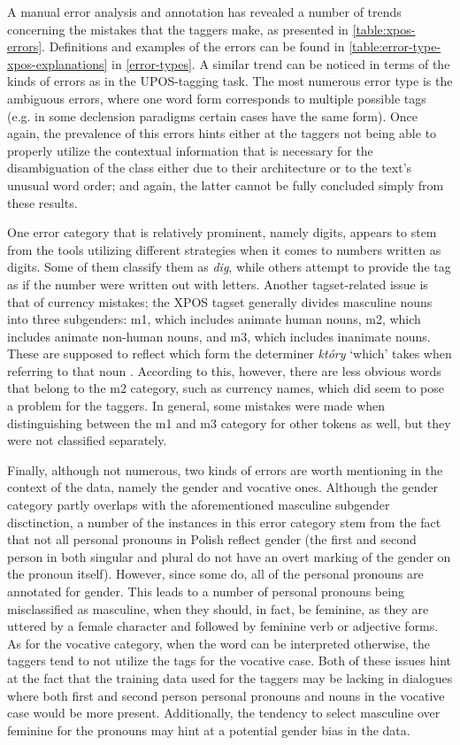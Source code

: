 A manual error analysis and annotation has revealed a number of trends concerning the mistakes that the taggers make, as presented in \autoref{table:xpos-errors}. Definitions and examples of the errors can be found in \autoref{table:error-type-xpos-explanations} in \autoref{error-types}. A similar trend can be noticed in terms of the kinds of errors as in the UPOS-tagging task. The most numerous error type is the ambiguous errors, where one word form corresponds to multiple possible tags (e.g. in some declension paradigms certain cases have the same form). Once again, the prevalence of this errors hints either at the taggers not being able to properly utilize the contextual information that is necessary for the disambiguation of the class either due to their architecture or to the text's unusual word order; and again, the latter cannot be fully concluded simply from these results. 

One error category that is relatively prominent, namely digits, appears to stem from the tools utilizing different strategies when it comes to numbers written as digits. Some of them classify them as \textit{dig}, while others attempt to provide the tag as if the number were written out with letters. Another tagset-related issue is that of currency mistakes; the XPOS tagset generally divides masculine nouns into three subgenders: m1, which includes animate human nouns, m2, which includes animate non-human nouns, and m3, which includes inanimate nouns. These are supposed to reflect which form the determiner \textit{który} `which' takes when referring to that noun \citep{ud-masculine-gender}. According to this, however, there are less obvious words that belong to the m2 category, such as currency names, which did seem to pose a problem for the taggers. In general, some mistakes were made when distinguishing between the m1 and m3 category for other tokens as well, but they were not classified separately.

Finally, although not numerous, two kinds of errors are worth mentioning in the context of the data, namely the gender and vocative ones. Although the gender category partly overlaps with the aforementioned masculine subgender disctinction, a number of the instances in this error category stem from the fact that not all personal pronouns in Polish reflect gender (the first and second person in both singular and plural do not have an overt marking of the gender on the pronoun itself). However, since some do, all of the personal pronouns are annotated for gender. This leads to a number of personal pronouns being misclassified as masculine, when they should, in fact, be feminine, as they are uttered by a female character and followed by feminine verb or adjective forms. As for the vocative category, when the word can be interpreted otherwise, the taggers tend to not utilize the tags for the vocative case. Both of these issues hint at the fact that the training data used for the taggers may be lacking in dialogues where both first and second person personal pronouns and nouns in the vocative case would be more present. Additionally, the tendency to select masculine over feminine for the pronouns may hint at a potential gender bias in the data.

